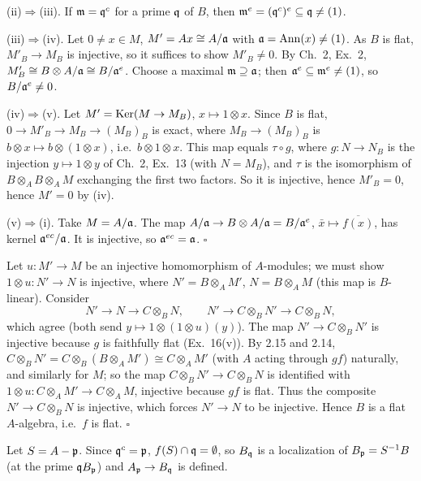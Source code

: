 \documentclass[11pt]{article}
\begin{document}
(ii)$\Rightarrow$(iii). If $\mathfrak m=\mathfrak q^c$ for a prime $\mathfrak q$ of $B$, then $\mathfrak m^e=(\mathfrak q^c)^e\subseteq\mathfrak q\ne(1)$.

(iii)$\Rightarrow$(iv). Let $0\ne x\in M$, $M'=Ax\cong A/\mathfrak a$ with $\mathfrak a=\operatorname{Ann}(x)\ne(1)$. As $B$ is flat, $M'_B\to M_B$ is injective, so it suffices to show $M'_B\ne0$. By Ch.~2, Ex.~2, $M'_B\cong B\otimes A/\mathfrak a\cong B/\mathfrak a^e$. Choose a maximal $\mathfrak m\supseteq\mathfrak a$; then $\mathfrak a^e\subseteq\mathfrak m^e\ne(1)$, so $B/\mathfrak a^e\ne0$.

(iv)$\Rightarrow$(v). Let $M'=\operatorname{Ker}(M\to M_B)$, $x\mapsto1\otimes x$. Since $B$ is flat, $0\to M'_B\to M_B\to(M_B)_B$ is exact, where $M_B\to(M_B)_B$ is $b\otimes x\mapsto b\otimes(1\otimes x)$, i.e.\ $b\otimes1\otimes x$. This map equals $\tau\circ g$, where $g:N\to N_B$ is the injection $y\mapsto1\otimes y$ of Ch.~2, Ex.~13 (with $N=M_B$), and $\tau$ is the isomorphism of $B\otimes_AB\otimes_AM$ exchanging the first two factors. So it is injective, hence $M'_B=0$, hence $M'=0$ by (iv).

(v)$\Rightarrow$(i). Take $M=A/\mathfrak a$. The map $A/\mathfrak a\to B\otimes A/\mathfrak a=B/\mathfrak a^e$, $\bar x\mapsto\overline{f(x)}$, has kernel $\mathfrak a^{ec}/\mathfrak a$. It is injective, so $\mathfrak a^{ec}=\mathfrak a$. \hfill$\square$

\pf
Let $u:M'\to M$ be an injective homomorphism of $A$-modules; we must show $1\otimes u:N'\to N$ is injective, where $N'=B\otimes_AM'$, $N=B\otimes_AM$ (this map is $B$-linear). Consider
\[
N'\longrightarrow N\longrightarrow C\otimes_BN,\qquad N'\longrightarrow C\otimes_BN'\longrightarrow C\otimes_BN,
\]
which agree (both send $y\mapsto1\otimes(1\otimes u)(y)$). The map $N'\to C\otimes_BN'$ is injective because $g$ is faithfully flat (Ex.~16(v)). By 2.15 and 2.14, $C\otimes_BN'=C\otimes_B(B\otimes_AM')\cong C\otimes_AM'$ (with $A$ acting through $gf$) naturally, and similarly for $M$; so the map $C\otimes_BN'\to C\otimes_BN$ is identified with $1\otimes u:C\otimes_AM'\to C\otimes_AM$, injective because $gf$ is flat. Thus the composite $N'\to C\otimes_BN$ is injective, which forces $N'\to N$ to be injective. Hence $B$ is a flat $A$-algebra, i.e.\ $f$ is flat. \hfill$\square$

\pf
Let $S=A-\mathfrak p$. Since $\mathfrak q^c=\mathfrak p$, $f(S)\cap\mathfrak q=\emptyset$, so $B_\mathfrak q$ is a localization of $B_\mathfrak p=S^{-1}B$ (at the prime $\mathfrak q B_\mathfrak p$) and $A_\mathfrak p\to B_\mathfrak q$ is defined.
\end{document}
